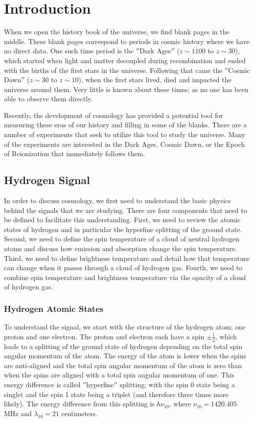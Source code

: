 \chapter{Introduction}\label{Ch:Intro}
When we open the history book of the universe, we find blank pages in the middle. These blank pages correspond to periods in cosmic history where we have no direct data. One such time period is the $''$Dark Ages$''$ ($z \sim 1100$ to $z \sim 30$), which started when light and matter decoupled during recombination and ended with the births of the first stars in the universe. Following that came the $''$Cosmic Dawn$''$ ($z\sim 30$ to $z\sim 10$), when the first stars lived, died and impacted the universe around them. Very little is known about these times; as no one has been able to observe them directly. 

Recently, the development of \cm cosmology has provided a potential tool for measuring these eras of our history and filling in some of the blanks. There are a number of experiments that seek to utilize this tool to study the universe. Many of the experiments are interested in the Dark Ages, Cosmic Dawn, or the Epoch of Reionization that immediately follows them.  

\section{Hydrogen \cm Signal}
In order to discuss \cm cosmology, we first need to understand the basic physics behind the signals that we are studying. There are four components that need to be defined to facilitate this understanding. First, we need to review the atomic states of hydrogen and in particular the hyperfine splitting of the ground state. Second, we need to define the spin temperature of a cloud of neutral hydrogen atoms and discuss how emission and absorption change the spin temperature. Third, we need to define brightness temperature and detail how that temperature can change when it passes through a cloud of hydrogen gas. Fourth, we need to combine spin temperature and brightness temperature via the opacity of a cloud of hydrogen gas. 

\subsection{Hydrogen Atomic States}
To understand the \cm signal, we start with the structure of the hydrogen atom; one proton and one electron. The proton and electron each have a spin $\pm \frac{1}{2}$, which leads to a splitting of the ground state of hydrogen depending on the total spin angular momentum of the atom. The energy of the atom is lower when the spins are anti-aligned and the total spin angular momentum of the atom is zero than when the spins are aligned with a total spin angular momentum of one. This energy difference is called $''$hyperfine$''$ splitting; with the spin 0 state being a singlet and the spin 1 state being a triplet (and therefore three times more likely). The energy difference from this splitting is $h \nu_{10}$, where $\nu_{10}=1420.405$ MHz and $\lambda_{10} =  21$ centimeters.  

